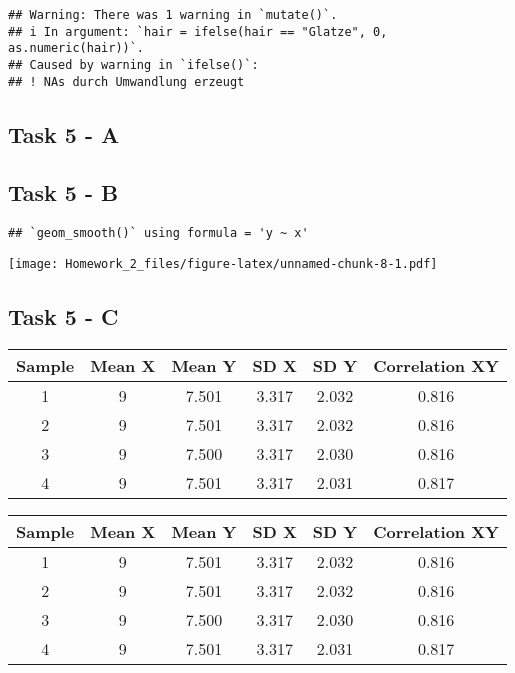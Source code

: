 \documentclass[
]{article}
\begin{document}
\begin{verbatim}
## Warning: There was 1 warning in `mutate()`.
## i In argument: `hair = ifelse(hair == "Glatze", 0, as.numeric(hair))`.
## Caused by warning in `ifelse()`:
## ! NAs durch Umwandlung erzeugt
\end{verbatim}

\subsection{Task 5 - A}\label{task-5---a}

\subsection{Task 5 - B}\label{task-5---b}

\begin{verbatim}
## `geom_smooth()` using formula = 'y ~ x'
\end{verbatim}

\texttt{[image: Homework\_2\_files/figure-latex/unnamed-chunk-8-1.pdf]}

\subsection{Task 5 - C}\label{task-5---c}

\begin{longtable}[t]{cccccc}
\toprule
Sample & Mean X & Mean Y & SD X & SD Y & Correlation XY\\
\midrule
1 & 9 & 7.501 & 3.317 & 2.032 & 0.816\\
2 & 9 & 7.501 & 3.317 & 2.032 & 0.816\\
3 & 9 & 7.500 & 3.317 & 2.030 & 0.816\\
4 & 9 & 7.501 & 3.317 & 2.031 & 0.817\\
\bottomrule
\end{longtable}

\begin{longtable}[t]{cccccc}
\toprule
Sample & Mean X & Mean Y & SD X & SD Y & Correlation XY\\
\midrule
1 & 9 & 7.501 & 3.317 & 2.032 & 0.816\\
2 & 9 & 7.501 & 3.317 & 2.032 & 0.816\\
3 & 9 & 7.500 & 3.317 & 2.030 & 0.816\\
4 & 9 & 7.501 & 3.317 & 2.031 & 0.817\\
\bottomrule
\end{longtable}
\end{document}
